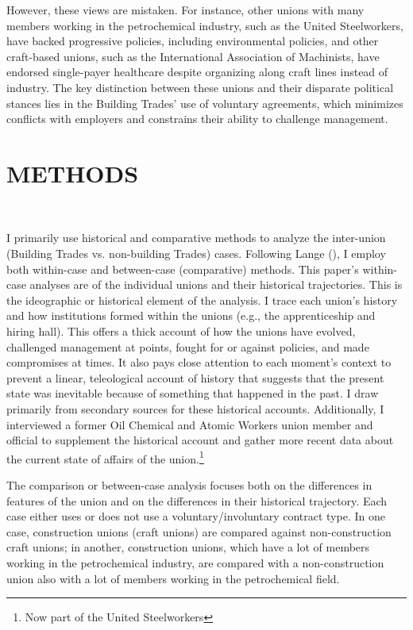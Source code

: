 \documentclass[12pt]{article}
\begin{document}
However, these views are mistaken. For instance, other unions with many members working in the petrochemical industry, such as the United Steelworkers, have backed progressive policies, including environmental policies, and other craft-based unions, such as the International Association of Machinists, have endorsed single-payer healthcare despite organizing along craft lines instead of industry. The key distinction between these unions and their disparate political stances lies in the Building Trades' use of voluntary agreements, which minimizes conflicts with employers and constrains their ability to challenge management.


\section{METHODS} \

I primarily use historical and comparative methods to analyze the inter-union (Building Trades vs. non-building Trades) cases. Following Lange (\citeyear{lange2013}), I employ both within-case and between-case (comparative) methods. This paper's within-case analyses are of the individual unions and their historical trajectories. This is the ideographic or historical element of the analysis. I trace each union's history and how institutions formed within the unions (e.g., the apprenticeship and hiring hall). This offers a thick account of how the unions have evolved, challenged management at points, fought for or against policies, and made compromises at times. It also pays close attention to each moment's context to prevent a linear, teleological account of history that suggests that the present state was inevitable because of something that happened in the past. I draw primarily from secondary sources for these historical accounts. Additionally, I interviewed a former Oil Chemical and Atomic Workers union member and official to supplement the historical account and gather more recent data about the current state of affairs of the union.\footnote{Now part of the United Steelworkers}

The comparison or between-case analysis focuses both on the differences in features of the union and on the differences in their historical trajectory. Each case either uses or does not use a voluntary/involuntary contract type. In one case, construction unions (craft unions) are compared against non-construction craft unions; in another, construction unions, which have a lot of members working in the petrochemical industry, are compared with a non-construction union also with a lot of members working in the petrochemical field. 
\end{document}
